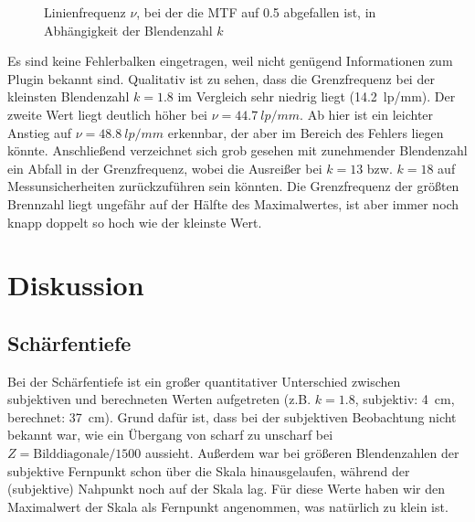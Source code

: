 \begin{figure}[H]
\centering
{}
\caption{Linienfrequenz $\nu$, bei der die MTF auf \num{0.5} abgefallen ist, in Abhängigkeit der Blendenzahl $k$}
\label{fig:mtf}
\end{figure}

Es sind keine Fehlerbalken eingetragen, weil nicht genügend Informationen zum Plugin bekannt sind. Qualitativ ist zu sehen, dass die Grenzfrequenz bei der kleinsten Blendenzahl $k=\num{1.8}$ im Vergleich sehr niedrig liegt (\SI{14.2}{lp/mm}). Der zweite Wert liegt deutlich höher bei $\nu=\SI{44.7}{lp/mm}$. Ab hier ist ein leichter Anstieg auf $\nu=\SI{48.8}{lp/mm}$ erkennbar, der aber im Bereich des Fehlers liegen könnte. Anschließend verzeichnet sich grob gesehen mit zunehmender Blendenzahl ein Abfall in der Grenzfrequenz, wobei die Ausreißer bei $k=13$ bzw. $k=18$ auf Messunsicherheiten zurückzuführen sein könnten. Die Grenzfrequenz der größten Brennzahl liegt ungefähr auf der Hälfte des Maximalwertes, ist aber immer noch knapp doppelt so hoch wie der kleinste Wert.
\section{Diskussion}

\subsection{Schärfentiefe}

Bei der Schärfentiefe ist ein großer quantitativer Unterschied zwischen subjektiven und berechneten Werten aufgetreten (z.B. $k=\num{1.8}$, subjektiv: \SI{4}{cm}, berechnet: \SI{37}{cm}). Grund dafür ist, dass bei der subjektiven Beobachtung nicht bekannt war, wie ein Übergang von scharf zu unscharf bei $Z=\text{Bilddiagonale}/1500$ aussieht. Außerdem war bei größeren Blendenzahlen der subjektive Fernpunkt schon über die Skala hinausgelaufen, während der (subjektive) Nahpunkt noch auf der Skala lag. Für diese Werte haben wir den Maximalwert der Skala als Fernpunkt angenommen, was natürlich zu klein ist.

